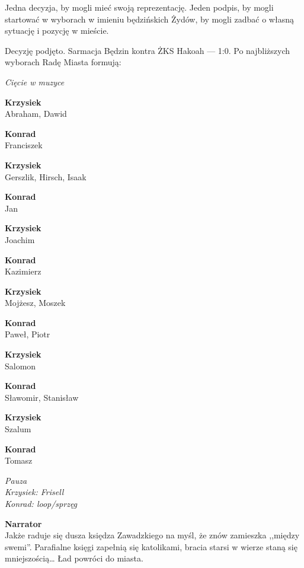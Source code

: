 \documentclass[11pt,a4paper,oneside]{article}
\begin{document}
Jedna decyzja, by mogli mieć swoją reprezentację. Jeden podpis, by %
mogli startować w wyborach w imieniu będzińskich Żydów, by mogli
zadbać o własną sytuację i pozycję w mieście. 

Decyzję podjęto. Sarmacja Będzin kontra ŻKS Hakoah --- 1:0. Po
najbliższych wyborach Radę Miasta formują:

{\color{light-gray} \emph{Cięcie w muzyce}}

{\color{krzysiek}
\textbf{Krzysiek}\\
Abraham, Dawid
}

{\color{konrad}
\textbf{Konrad}\\
Franciszek
}

{\color{krzysiek}
\textbf{Krzysiek}\\
Gerszlik, Hirsch, Isaak
}

{\color{konrad}
\textbf{Konrad}\\
Jan
}

{\color{krzysiek}
\textbf{Krzysiek}\\
Joachim
}

{\color{konrad}
\textbf{Konrad}\\
Kazimierz
}

{\color{krzysiek}
\textbf{Krzysiek}\\
Mojżesz,  Moszek
}

{\color{konrad}
\textbf{Konrad}\\
Paweł, Piotr
}

{\color{krzysiek}
\textbf{Krzysiek}\\
Salomon
}

{\color{konrad}
\textbf{Konrad}\\
Sławomir,  Stanisław
}

{\color{krzysiek}
\textbf{Krzysiek}\\
Szalum
}

{\color{konrad}
\textbf{Konrad}\\
Tomasz
}

{\color{light-gray} \emph{Pauza}}\\
{\color{krzysiek} \emph{Krzysiek: Frisell}}\\
{\color{konrad} \emph{Konrad: loop/sprzęg}}

\textbf{Narrator}\\
 Jakże raduje się
dusza księdza Zawadzkiego na myśl, że znów zamieszka ,,między swemi''.
Parafialne księgi zapełnią się katolikami, bracia starsi w wierze
staną się mniejszością\dots{} Ład powróci do miasta.
\end{document}
